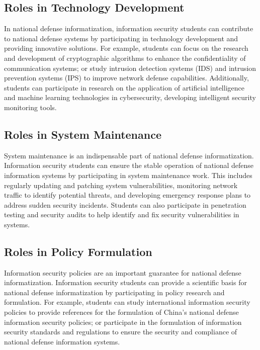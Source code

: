 \documentclass[12pt, a4paper]{article}
\begin{document}
\subsection{Roles in Technology Development}

In national defense informatization, information security students can contribute to national defense systems by participating in technology development and providing innovative solutions. For example, students can focus on the research and development of cryptographic algorithms to enhance the confidentiality of communication systems; or study intrusion detection systems (IDS) and intrusion prevention systems (IPS) to improve network defense capabilities. Additionally, students can participate in research on the application of artificial intelligence and machine learning technologies in cybersecurity, developing intelligent security monitoring tools.

\subsection{Roles in System Maintenance}

System maintenance is an indispensable part of national defense informatization. Information security students can ensure the stable operation of national defense information systems by participating in system maintenance work. This includes regularly updating and patching system vulnerabilities, monitoring network traffic to identify potential threats, and developing emergency response plans to address sudden security incidents. Students can also participate in penetration testing and security audits to help identify and fix security vulnerabilities in systems.

\subsection{Roles in Policy Formulation}

Information security policies are an important guarantee for national defense informatization. Information security students can provide a scientific basis for national defense informatization by participating in policy research and formulation. For example, students can study international information security policies to provide references for the formulation of China's national defense information security policies; or participate in the formulation of information security standards and regulations to ensure the security and compliance of national defense information systems.
\end{document}
